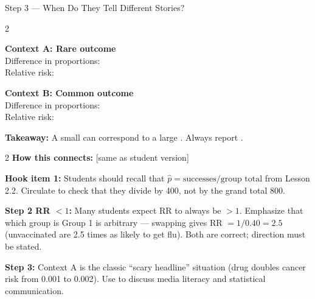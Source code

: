 \documentclass[10pt]{article}
\begin{document}
\vspace{0.1in}

\begin{notesbox}{Step 3 --- When Do They Tell Different Stories?}
\small
\begin{multicols}{2}

\textbf{Context A: Rare outcome}\\
Difference in proportions: \\
Relative risk: 

\vspace{4pt}

\columnbreak

\textbf{Context B: Common outcome}\\
Difference in proportions: \\
Relative risk: 

\vspace{4pt}

\end{multicols}

\vspace{4pt}
\textbf{Takeaway:} A small  can correspond to a large .
Always report .
\end{notesbox}

\vspace{0.1in}

\begin{spiralbox}
\small
\begin{multicols}{2}
\textbf{How this connects:} [same as student version]

\columnbreak

\end{multicols}
\end{spiralbox}

\begin{teachernote}
\textbf{Hook item 1:} Students should recall that $\hat{p} = \text{successes}/\text{group total}$
from Lesson 2.2. Circulate to check that they divide by 400, not by the grand total 800.

\textbf{Step 2 RR $< 1$:} Many students expect RR to always be $>1$. Emphasize that which group
is Group 1 is arbitrary --- swapping gives RR $= 1/0.40 = 2.5$ (unvaccinated are 2.5 times as
likely to get flu). Both are correct; direction must be stated.

\textbf{Step 3:} Context A is the classic ``scary headline'' situation (drug doubles cancer risk
from 0.001 to 0.002). Use to discuss media literacy and statistical communication.
\end{teachernote}
\end{document}
